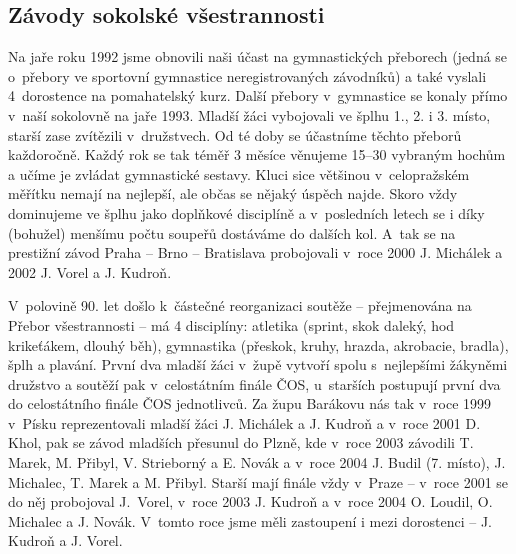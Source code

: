 \documentclass[a5paper, 11pt, twoside]{article}
\begin{document}
\subsection{Závody sokolské všestrannosti}

Na jaře roku 1992 jsme obnovili naši účast na gymnastických přeborech
(jedná se o~přebory ve sportovní gymnastice neregistrovaných závodníků)
a také vyslali 4~dorostence na pomahatelský kurz. Další přebory
v~gymnastice se konaly přímo v~naší sokolovně na jaře 1993. Mladší žáci
vybojovali ve šplhu 1., 2. i 3. místo, starší zase zvítězili
v~družstvech. Od té doby se účastníme těchto přeborů každoročně. Každý rok
se tak téměř 3 měsíce věnujeme 15--30 vybraným hochům a učíme je zvládat
gymnastické sestavy. Kluci sice většinou v~celopražském měřítku nemají
na nejlepší, ale občas se nějaký úspěch najde. Skoro vždy dominujeme ve
šplhu jako doplňkové disciplíně a v~posledních letech se i díky
(bohužel) menšímu počtu soupeřů dostáváme do dalších kol. A~tak se na
prestižní závod Praha -- Brno -- Bratislava probojovali v~roce 2000 J.
Michálek a 2002 J. Vorel a J. Kudroň.

V~polovině 90. let došlo k~částečné reorganizaci soutěže -- přejmenována
na Přebor všestrannosti -- má 4 disciplíny: atletika (sprint, skok
daleký, hod krikeťákem, dlouhý běh), gymnastika (přeskok, kruhy, hrazda,
akrobacie, bradla), šplh a plavání. První dva mladší žáci v~župě vytvoří
spolu s~nejlepšími žákyněmi družstvo a soutěží pak v~celostátním finále
ČOS, u~starších postupují první dva do celostátního finále ČOS
jednotlivců. Za župu Barákovu nás tak v~roce 1999 v~Písku reprezentovali
mladší žáci J. Michálek a J. Kudroň a v~roce 2001 D. Khol, pak se závod
mladších přesunul do Plzně, kde v~roce 2003 závodili T. Marek, M.
Přibyl, V. Strieborný a E. Novák a v~roce 2004 J. Budil (7. místo), J.
Michalec, T. Marek a M. Přibyl. Starší mají finále vždy v~Praze --
v~roce 2001 se do něj probojoval J.~Vorel, v~roce 2003 J. Kudroň a v~roce
2004 O. Loudil, O. Michalec a J. Novák. V~tomto roce jsme měli
zastoupení i mezi dorostenci -- J. Kudroň a J. Vorel.
\end{document}

